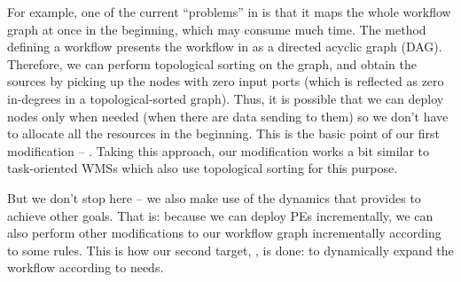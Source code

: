 For example, one of the current ``problems'' in \dpy is that it maps the whole workflow graph at once in the beginning, which may consume much time. The method defining a workflow presents the workflow in \dpy as a directed acyclic graph (DAG). Therefore, we can perform topological sorting on the graph, and obtain the sources by picking up the nodes with zero input ports (which is reflected as zero in-degrees in a topological-sorted graph). Thus, it is possible that we can deploy nodes only when needed (\eg when there are data sending to them) so we don't have to allocate all the resources in the beginning. This is the basic point of our first modification -- \tincdep. Taking this approach, our modification works a bit similar to task-oriented WMSs which also use topological sorting for this purpose.

But we don't stop here -- we also make use of the dynamics that \tincdep provides to achieve other goals. That is: because we can deploy PEs incrementally, we can also perform other modifications to our workflow graph incrementally according to some rules. This is how our second target, \tdynexp, is done: to dynamically expand the workflow according to needs.

